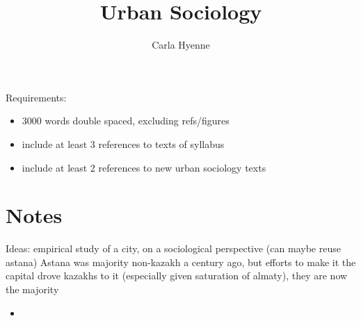 \documentclass{article}
\title{Urban Sociology}
\author{Carla Hyenne }
\begin{document}
\maketitle

Requirements:
\begin{itemize}
	\item 3000 words double spaced, excluding refs/figures
	\item include at least 3 references to texts of syllabus
	\item include at least 2 references to new urban sociology texts
\end{itemize}


\section{Notes}


Ideas: empirical study of a city, on a sociological perspective (can maybe reuse astana)
Astana was majority non-kazakh a century ago, but efforts to make it the capital drove kazakhs to it (especially given saturation of almaty), they are now the majority



\begin{itemize}
	\item
\end{itemize}
\end{document}
